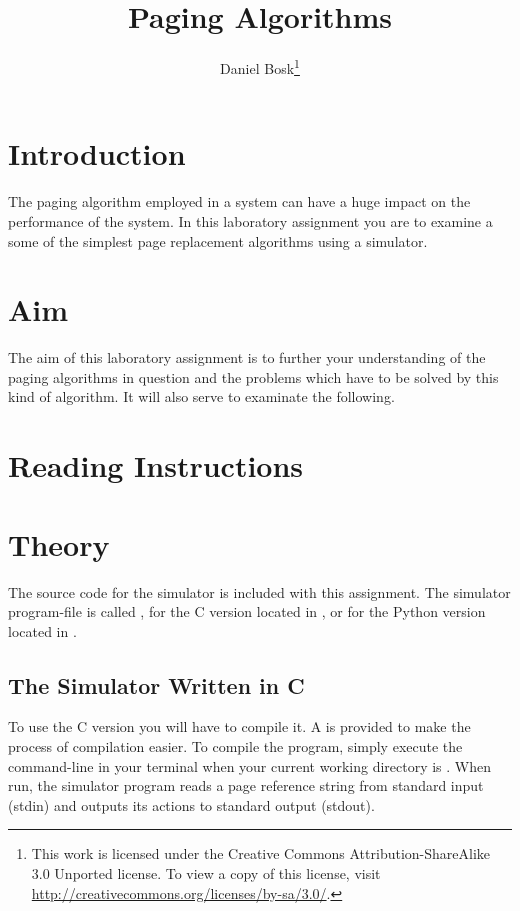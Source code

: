\documentclass[a4paper,nocourse]{miunasgn}
\title{Paging Algorithms}
\author{Daniel Bosk\footnote{%
	This work is licensed under the Creative Commons Attribution-ShareAlike 3.0 
	Unported license.
	To view a copy of this license, visit 
	\url{http://creativecommons.org/licenses/by-sa/3.0/}.
}}
\date{\svnId}
\begin{document}
\maketitle
\thispagestyle{foot}
\tableofcontents


\section{Introduction}
\label{sec:Intro}
The paging algorithm employed in a system can have a huge impact on the 
performance of the system.
In this laboratory assignment you are to examine a some of the simplest page 
replacement algorithms using a simulator.


\section{Aim}
\label{sec:Aim}
The aim of this laboratory assignment is to further your understanding of the 
paging algorithms in question and the problems which have to be solved by this 
kind of algorithm.
It will also serve to examinate the following.
\begin{itemize}
		
\end{itemize}


\section{Reading Instructions}
\label{sec:Reading}



\section{Theory}
\label{sec:Theory}
The source code for the simulator is included with this assignment.
The simulator program-file is called , for the C version located in 
, or  for the Python version located in 
.

\subsection{The Simulator Written in C}

To use the C version you will have to compile it.
A  is provided to make the process of compilation easier.
To compile the program, simply execute the command-line  in 
your terminal when your current working directory is .
When run, the simulator program reads a page reference string from standard 
input (stdin) and outputs its actions to standard output (stdout).
\end{document}
